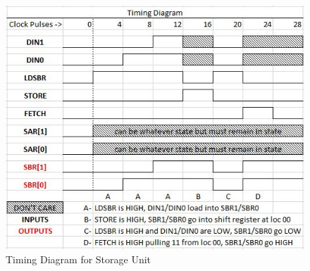 \documentclass[journal, twocolumn, final,11pt,letterpaper]{IEEEtran}
\begin{document}
\begin{figure}[h]
	\centering
	\includegraphics[scale=0.75]{Timing_Diagram.jpg}
	\caption{Timing Diagram for Storage Unit}
	\label{fig:timing-diagram}
\end{figure}

\end{document}
